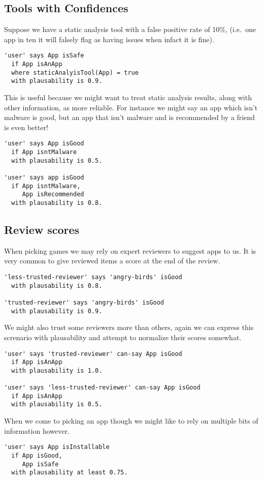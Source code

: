 \documentclass[a4paper]{article}
\begin{document}
\subsection{Tools with Confidences}

Suppose we have a static analysis tool with a false positive rate of 10\%, (i.e.~one app in ten it will falsely flag as having issues when infact it is fine).

\begin{lstlisting}
'user' says App isSafe
  if App isAnApp
  where staticAnalyisTool(App) = true
  with plausability is 0.9.
\end{lstlisting}

This is useful because we might want to treat static analysis results, along with other information, as more reliable.  For instance we might say an app which isn't malware is good, but an app that isn't malware and is recommended by a friend is even better!

\begin{lstlisting}
'user' says App isGood
  if App isntMalware
  with plausability is 0.5.

'user' says app isGood
  if App isntMalware,
     App isRecommended
  with plausability is 0.8.
\end{lstlisting}

\subsection{Review scores}

When picking games we may rely on expert reviewers to suggest apps to us.
It is very common to give reviewed items a score at the end of the review.

\begin{lstlisting}
'less-trusted-reviewer' says 'angry-birds' isGood
  with plausability is 0.8.

'trusted-reviewer' says 'angry-birds' isGood
  with plausability is 0.9.
\end{lstlisting}

We might also trust some reviewers more than others, again we can express this screnario with plausability and attempt to normalize their scores somewhat.

\begin{lstlisting}
'user' says 'trusted-reviewer' can-say App isGood
  if App isAnApp
  with plausability is 1.0.

'user' says 'less-trusted-reviewer' can-say App isGood
  if App isAnApp
  with plausability is 0.5.
\end{lstlisting}

When we come to picking an app though we might like to rely on multiple bits of information however.

\begin{lstlisting}
'user' says App isInstallable
  if App isGood,
     App isSafe
  with plausability at least 0.75.
\end{lstlisting}
\end{document}

